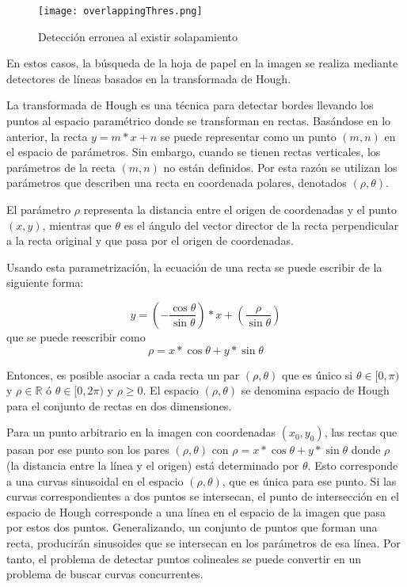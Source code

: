 \begin{figure}[h!] 
  \centering
  \texttt{[image: overlappingThres.png]}
  \caption{Detección erronea al existir solapamiento}
  \label{fig:overlappingThres}
\end{figure}

En estos casos, la búsqueda de la hoja de papel en la imagen se realiza mediante detectores de líneas basados
en la transformada de Hough.

La transformada de Hough es una técnica para detectar bordes llevando los puntos al espacio
paramétrico donde se transforman en rectas.
Basándose en lo anterior, la recta $y = m*x+n$ se puede representar como un punto $(m,n)$ en el
espacio de parámetros. Sin embargo, cuando se tienen rectas
verticales, los parámetros de la recta $(m,n)$  no están definidos. Por esta razón se utilizan los parámetros
que describen una recta en coordenada polares, denotados $(\rho,\theta)$.

El parámetro $\rho$ representa la distancia entre el origen de coordenadas y el punto$(x,y)$,
mientras que $\theta$ es el ángulo del vector director de la recta perpendicular a la recta original
y que pasa por el origen de coordenadas.

Usando esta parametrización, la ecuación de una recta se puede escribir de la siguiente forma:

\begin{equation}
y=(-\dfrac{\cos \theta}{\sin \theta}) * x + (\dfrac{\rho}{\sin \theta})
\end{equation}
que se puede reescribir como
\begin{equation}
\rho=x * \cos \theta + y * \sin \theta
\end{equation}

Entonces, es posible asociar a cada recta un par $(\rho,\theta)$ que es único si $\theta \in
[0,\pi)$ y $\rho \in \mathbb{R}$ ó $\theta \in [0,2\pi)$ y $\rho \geq 0$. El espacio
$(\rho,\theta)$ se denomina espacio de Hough para el conjunto de rectas en dos dimensiones.

Para un punto arbitrario en la imagen con coordenadas $(x_0,y_0)$, las rectas que pasan por ese punto son los pares  $(\rho,\theta)$ con  $\rho=x*\cos \theta + y * \sin \theta$ donde $\rho$ (la distancia entre la línea y el origen) está determinado por $\theta$. Esto corresponde a una curvas sinusoidal en el espacio  $(\rho,\theta)$, que es única para ese punto. Si las curvas correspondientes  a dos puntos se intersecan, el punto de intersección en el espacio de Hough corresponde  a una línea en el espacio de la imagen que pasa por estos dos puntos. Generalizando, un conjunto de puntos que forman una recta, producirán sinusoides que se intersecan en los parámetros de esa línea. Por tanto, el problema de detectar puntos colineales se puede convertir en un problema
de buscar curvas concurrentes.

